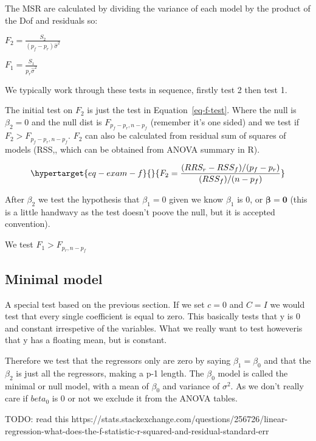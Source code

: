 \documentclass[
  letterpaper,
  DIV=11,
  numbers=noendperiod]{scrreprt}
\begin{document}
The MSR are calculated by dividing the variance of each model by the
product of the Dof and residuals so:

\(F_2 = \frac{S_2}{(p_f-p_r)\hat{\sigma}^2}\)

\(F_1 = \frac{S_1}{p_r\hat{\sigma}^2}\)

We typically work through these tests in sequence, firstly test 2 then
test 1.

The initial test on \(F_2\) is just the test in
Equation~\ref{eq-f-test}. Where the null is \(\beta_2 = 0\) and the null
dist is \(F_{p_f-p_r, n-p_f}\) (remember it's one sided) and we test if
\(F_2 >F_{p_f-p_r, n-p_f}\). \(F_2\) can also be calculated from
residual sum of squares of models (RSS,, which can be obtained from
ANOVA summary in R).

\begin{equation}\protect\hypertarget{eq-exam-f}{}{F_2 = \frac{(RRS_r - RSS_f) / (p_f - p_r)}{(RSS_f)/(n-p_f)}}\label{eq-exam-f}\end{equation}

After \(\beta_2\) we test the hypothesis that \(\beta_1=0\) given we
know \(\beta_1\) is 0, or \(\boldsymbol{\beta}=\textbf{0}\) (this is a
little handwavy as the test doesn't poove the null, but it is accepted
convention).

We test \(F_1 > F_{p_r, n-p_f}\)

\hypertarget{minimal-model}{%
\subsection{Minimal model}\label{minimal-model}}

A special test based on the previous section. If we set \(c=0\) and
\(C=I\) we would test that every single coefficient is equal to zero.
This basically tests that y is 0 and constant irrespetive of the
variables. What we really want to test howeveris that y has a floating
mean, but is constant.

Therefore we test that the regressors only are zero by saying
\(\beta_1 = \beta_0\) and that the \(\beta_2\) is just all the
regressors, making a p-1 length. The \(\beta_0\) model is called the
minimal or null model, with a mean of \(\beta_0\) and variance of
\(\sigma^2\). As we don't really care if \(beta_0\) is 0 or not we
exclude it from the ANOVA tables.

TODO: read this
https://stats.stackexchange.com/questions/256726/linear-regression-what-does-the-f-statistic-r-squared-and-residual-standard-err
\end{document}
